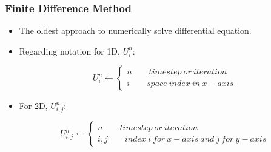 \begin{frame}[fragile]
\frametitle{Finite Difference Method}
\begin{itemize}
\item The oldest approach to numerically solve differential equation.
\item Regarding notation for 1D, $U_i^{n}$:
\begin{fleqn}
\begin{equation}
U_i^{n} \leftarrow \begin{cases} n \qquad timestep \ or \ iteration \\ 
      i \qquad space \ index \ in \ x-axis \end{cases} 
\end{equation}
\end{fleqn}

\item For 2D, $U_{i,j}^{n}$:
\begin{fleqn}
\begin{equation}
U_{i,j}^{n} \leftarrow \begin{cases} n \qquad timestep \ or \ iteration \\ 
      i,j \qquad index \ i \ for \ x-axis \ and \ j \ for \ y-axis \end{cases} 
\end{equation}
\end{fleqn}

\end{itemize}

\end{frame}